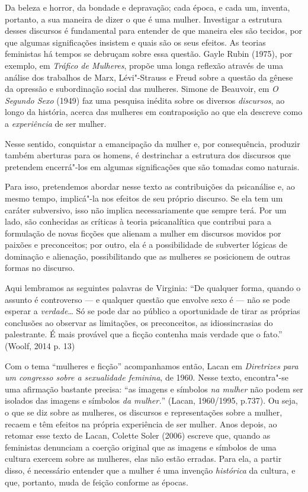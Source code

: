 Da beleza e horror, da bondade e depravação; cada época, e cada um,
inventa, portanto, a sua maneira de dizer o que é uma mulher. Investigar
a estrutura desses discursos é fundamental para entender de que maneira
eles são tecidos, por que algumas significações insistem e quais são os
seus efeitos. As teorias feministas há tempos se debruçam sobre essa
questão. Gayle Rubin (1975), por exemplo, em \emph{Tráfico de Mulheres},
propõe uma longa reflexão através de uma análise dos trabalhos de Marx,
Lévi"-Strauss e Freud sobre a questão da gênese da opressão e
subordinação social das mulheres. Simone de Beauvoir, em \emph{O Segundo
Sexo} (1949) faz uma pesquisa inédita sobre os diversos
\emph{discursos}, ao longo da história, acerca das mulheres em
contraposição ao que ela descreve como a \emph{experiência} de ser
mulher.

Nesse sentido, conquistar a emancipação da mulher e, por consequência,
produzir também aberturas para os homens, é destrinchar a estrutura dos
discursos que pretendem encerrá"-los em algumas significações que são
tomadas como naturais.

Para isso, pretendemos abordar nesse texto as contribuições da
psicanálise e, ao mesmo tempo, implicá"-la nos efeitos de seu próprio
discurso. Se ela tem um caráter subversivo, isso não implica
necessariamente que sempre terá. Por um lado, são conhecidas as críticas
à teoria psicanalítica que contribui para a formulação de novas ficções
que alienam a mulher em discursos movidos por paixões e preconceitos;
por outro, ela é a possibilidade de subverter lógicas de dominação e
alienação, possibilitando que as mulheres se posicionem de outras formas
no discurso.

Aqui lembramos as seguintes palavras de Virginia: ``De qualquer forma,
quando o assunto é controverso --- e qualquer questão que envolve sexo é
--- não se pode esperar a \emph{verdade}\ldots{} Só se pode dar ao público a
oportunidade de tirar as próprias conclusões ao observar as limitações,
os preconceitos, as idiossincrasias do palestrante. É mais provável que
a ficção contenha mais verdade que o fato.'' (Woolf, 2014 p. 13)

\asterisc

Com o tema ``mulheres e ficção'' acompanhamos então, Lacan em
\emph{Diretrizes para um congresso sobre a sexualidade feminina}, de
1960. Nesse texto, encontra"-se uma afirmação bastante precisa: ``as
imagens e símbolos \emph{na mulher} não podem ser isolados das imagens e
símbolos \emph{da mulher.}'' (Lacan, 1960/1995, p.737). Ou seja, o que
se diz sobre as mulheres, os discursos e representações sobre a mulher,
recaem e têm efeitos na própria experiência de ser mulher. Anos depois,
ao retomar esse texto de Lacan, Colette Soler (2006) escreve que, quando
as feministas denunciam a coerção original que as imagens e símbolos de
uma cultura exercem sobre as mulheres, elas não estão erradas. Para ela,
a partir disso, é necessário entender que a mulher é uma invenção
\emph{histórica} da cultura, e que, portanto, muda de feição conforme as
épocas.

